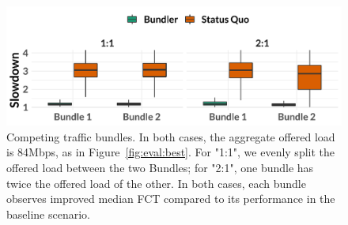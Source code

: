 \begin{figure}[t]
    \centering
\begin{knitrout}
\color{fgcolor}
\includegraphics[width=\maxwidth]{figure/robust_twobundler-1} 

\end{knitrout}
    \caption{Competing traffic bundles. In both cases, the aggregate offered load is 84Mbps, as in Figure~\ref{fig:eval:best}. For "1:1", we evenly split the offered load between the two Bundles; for "2:1", one bundle has twice the offered load of the other. In both cases, each bundle observes improved median FCT compared to its performance in the baseline scenario.}
    \label{fig:robust:twobundler}
\end{figure}
